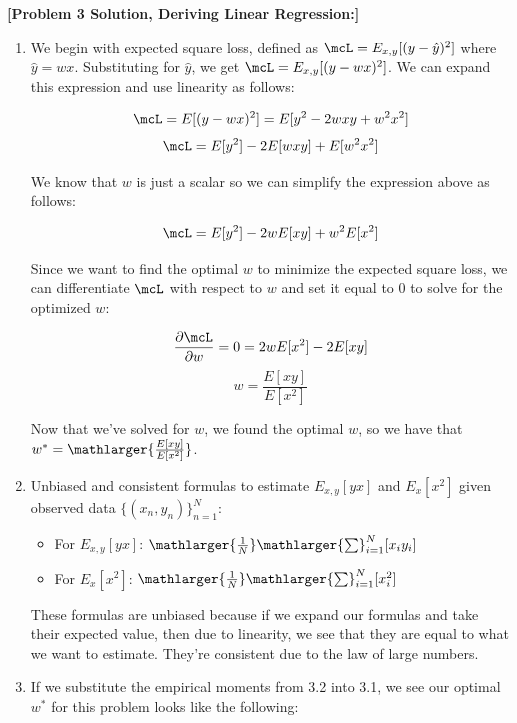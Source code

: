 \documentclass[submit]{harvardml}
\begin{document}
\newpage

\begin{solution}\textbf{[Problem 3 Solution, Deriving Linear Regression:]}

\begin{enumerate}
    \item We begin with expected square loss, defined as $\mcL = E_{x, y}[(y - \hat{y})^2]$ where $\hat{y} = wx$. Substituting for $\hat{y}$, we get $\mcL = E_{x, y}[(y-wx)^2]$. We can expand this expression and use linearity as follows:
    
    \[\mcL = E[(y-wx)^2] = E[y^2 - 2wxy + w^2x^2]\]
    \[\mcL = E[y^2] - 2E[wxy] + E[w^2x^2]\]
    
    We know that $w$ is just a scalar so we can simplify the expression above as follows:
    
    \[\mcL = E[y^2] - 2wE[xy] + w^2E[x^2]\]
    
    Since we want to find the optimal $w$ to minimize the expected square loss, we can differentiate $\mcL$ with respect to $w$ and set it equal to 0 to solve for the optimized $w$:
    
    \[\frac{\partial\mcL}{\partial w} = 0 = 2wE[x^2] - 2E[xy]\]
    \[w = \frac{E[xy]}{E[x^2]}\]
    
    Now that we've solved for $w$, we found the optimal $w$, so we have that $w^* = \mathlarger{\frac{E[xy]}{E[x^2]}}$.
    
    \item Unbiased and consistent formulas to estimate $E_{x, y}[yx]$
    and $E_x[x^2]$ given observed data $\{(x_n,y_n)\}_{n=1}^N$:
    
    \begin{itemize}
        \item For $E_{x, y}[yx]$: $\mathlarger{\frac{1}{N}}\mathlarger{\sum}^N_{i=1}[x_iy_i]$
        
        \item For $E_x[x^2]$: $\mathlarger{\frac{1}{N}}\mathlarger{\sum}^N_{i=1}[x_i^2]$
    \end{itemize}
    
    These formulas are unbiased because if we expand our formulas and take their expected value, then due to linearity, we see that they are equal to what we want to estimate. They're consistent due to the law of large numbers. 
    
    \item If we substitute the empirical moments from 3.2 into 3.1, we see our optimal $w^*$ for this problem looks like the following:
    

\end{enumerate}
\end{solution}
\end{document}
